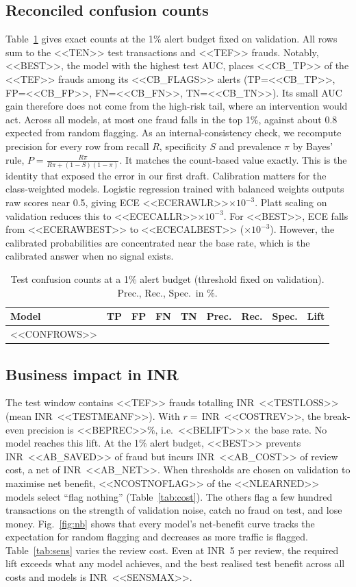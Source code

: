 \documentclass[conference]{IEEEtran}
\newcommand{\inr}{INR~}
\begin{document}
\subsection{Reconciled confusion counts}
Table~\ref{tab:conf} gives exact counts at the 1\% alert budget fixed on validation. All rows sum to the <<TEN>> test transactions and <<TEF>> frauds. Notably, <<BEST>>, the model with the highest test AUC, places <<CB_TP>> of the <<TEF>> frauds among its <<CB_FLAGS>> alerts (TP=<<CB_TP>>, FP=<<CB_FP>>, FN=<<CB_FN>>, TN=<<CB_TN>>). Its small AUC gain therefore does not come from the high-risk tail, where an intervention would act. Across all models, at most one fraud falls in the top 1\%, against about 0.8 expected from random flagging. As an internal-consistency check, we recompute precision for every row from recall $R$, specificity $S$ and prevalence $\pi$ by Bayes' rule, $P=\frac{R\pi}{R\pi+(1-S)(1-\pi)}$. It matches the count-based value exactly. This is the identity that exposed the error in our first draft. Calibration matters for the class-weighted models. Logistic regression trained with balanced weights outputs raw scores near 0.5, giving ECE <<ECERAWLR>>$\times10^{-3}$. Platt scaling on validation reduces this to <<ECECALLR>>$\times10^{-3}$. For <<BEST>>, ECE falls from <<ECERAWBEST>> to <<ECECALBEST>> ($\times10^{-3}$). However, the calibrated probabilities are concentrated near the base rate, which is the calibrated answer when no signal exists.

\begin{table}[t]
\centering
\caption{Test confusion counts at a 1\% alert budget (threshold fixed on validation). Prec., Rec., Spec.\ in \%.}\label{tab:conf}
\footnotesize
\setlength{\tabcolsep}{3pt}
\begin{tabular}{@{}lrrrrrrrr@{}}
\toprule
Model & TP & FP & FN & TN & Prec. & Rec. & Spec. & Lift \\
\midrule
<<CONFROWS>>
\bottomrule
\end{tabular}
\end{table}

\subsection{Business impact in INR}\label{sec:business}
The test window contains <<TEF>> frauds totalling \inr<<TESTLOSS>> (mean \inr<<TESTMEANF>>). With $r=$\,\inr<<COSTREV>>, the break-even precision is <<BEPREC>>\%, i.e.\ <<BELIFT>>$\times$ the base rate. No model reaches this lift. At the 1\% alert budget, <<BEST>> prevents \inr<<AB_SAVED>> of fraud but incurs \inr<<AB_COST>> of review cost, a net of \inr<<AB_NET>>. When thresholds are chosen on validation to maximise net benefit, <<NCOSTNOFLAG>> of the <<NLEARNED>> models select ``flag nothing'' (Table~\ref{tab:cost}). The others flag a few hundred transactions on the strength of validation noise, catch no fraud on test, and lose money. Fig.~\ref{fig:nb} shows that every model's net-benefit curve tracks the expectation for random flagging and decreases as more traffic is flagged. Table~\ref{tab:sens} varies the review cost. Even at \inr5 per review, the required lift exceeds what any model achieves, and the best realised test benefit across all costs and models is \inr<<SENSMAX>>.
\end{document}
